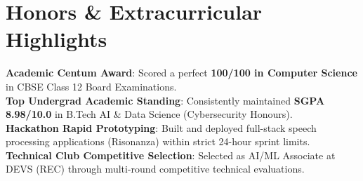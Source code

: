 \documentclass[letterpaper,10pt]{article}
\begin{document}
\section{Honors \& Extracurricular Highlights}
\begin{itemize}[leftmargin=0.15in, label={}]
  \small{\item{
    \textbf{Academic Centum Award}: Scored a perfect \textbf{100/100 in Computer Science} in CBSE Class 12 Board Examinations. \\ \vspace{2pt}
    \textbf{Top Undergrad Academic Standing}: Consistently maintained \textbf{SGPA 8.98/10.0} in B.Tech AI \& Data Science (Cybersecurity Honours). \\ \vspace{2pt}
    \textbf{Hackathon Rapid Prototyping}: Built and deployed full-stack speech processing applications (Risonanza) within strict 24-hour sprint limits. \\ \vspace{2pt}
    \textbf{Technical Club Competitive Selection}: Selected as AI/ML Associate at DEVS (REC) through multi-round competitive technical evaluations.
  }}
\end{itemize}

\end{document}
